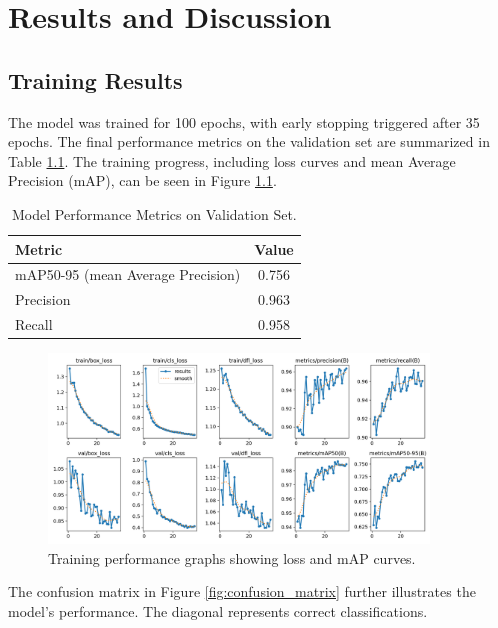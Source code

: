 \chapter{Results and Discussion}
\section{Training Results}
The model was trained for 100 epochs, with early stopping triggered after 35 epochs. The final performance metrics on the validation set are summarized in Table \ref{tab:metrics}. The training progress, including loss curves and mean Average Precision (mAP), can be seen in Figure \ref{fig:results_graph}.

\begin{table}[H]
\centering
\begin{tabular}{|l|c|}
\hline
\textbf{Metric} & \textbf{Value} \\
\hline
mAP50-95 (mean Average Precision) & 0.756 \\
Precision & 0.963 \\
Recall & 0.958 \\
\hline
\end{tabular}
\caption{Model Performance Metrics on Validation Set.}
\label{tab:metrics}
\end{table}

\begin{figure}[H]
    \centering
    \includegraphics[width=0.9\textwidth]{../runs/detect/helmet_detection/results.png}
    \caption{Training performance graphs showing loss and mAP curves.}
    \label{fig:results_graph}
\end{figure}

The confusion matrix in Figure \ref{fig:confusion_matrix} further illustrates the model's performance. The diagonal represents correct classifications.

